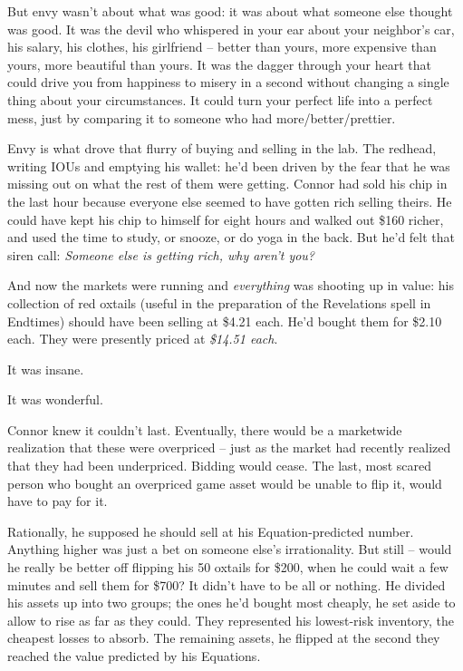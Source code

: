 But envy wasn't about what was good: it was about what someone else
thought was good. It was the devil who whispered in your ear about
your neighbor's car, his salary, his clothes, his girlfriend --
better than yours, more expensive than yours, more beautiful than
yours. It was the dagger through your heart that could drive you
from happiness to misery in a second without changing a single
thing about your circumstances. It could turn your perfect life
into a perfect mess, just by comparing it to someone who had
more/better/prettier.

Envy is what drove that flurry of buying and selling in the lab.
The redhead, writing IOUs and emptying his wallet: he'd been driven
by the fear that he was missing out on what the rest of them were
getting. Connor had sold his chip in the last hour because everyone
else seemed to have gotten rich selling theirs. He could have kept
his chip to himself for eight hours and walked out \$160 richer,
and used the time to study, or snooze, or do yoga in the back. But
he'd felt that siren call:
\emph{Someone else is getting rich, why aren't you?}

And now the markets were running and \emph{everything} was shooting
up in value: his collection of red oxtails (useful in the
preparation of the Revelations spell in Endtimes) should have been
selling at \$4.21 each. He'd bought them for \$2.10 each. They were
presently priced at \emph{\$14.51 each}.

It was insane.

It was wonderful.

Connor knew it couldn't last. Eventually, there would be a
marketwide realization that these were overpriced -- just as the
market had recently realized that they had been underpriced.
Bidding would cease. The last, most scared person who bought an
overpriced game asset would be unable to flip it, would have to pay
for it.

Rationally, he supposed he should sell at his Equation-predicted
number. Anything higher was just a bet on someone else's
irrationality. But still -- would he really be better off flipping
his 50 oxtails for \$200, when he could wait a few minutes and sell
them for \$700? It didn't have to be all or nothing. He divided his
assets up into two groups; the ones he'd bought most cheaply, he
set aside to allow to rise as far as they could. They represented
his lowest-risk inventory, the cheapest losses to absorb. The
remaining assets, he flipped at the second they reached the value
predicted by his Equations.


